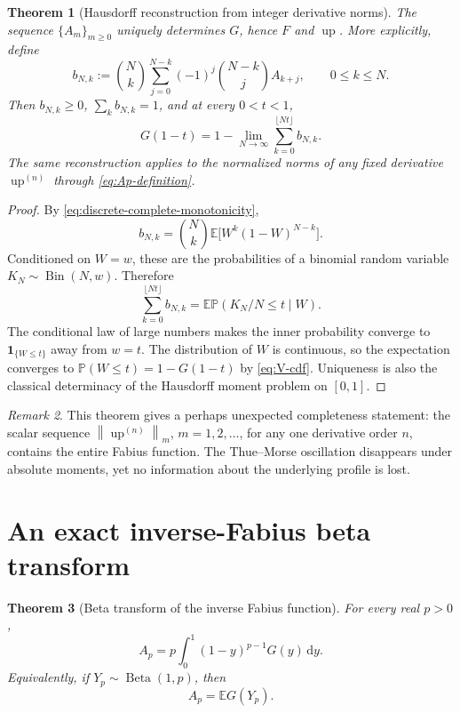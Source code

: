 \documentclass[11pt,oneside]{article}
\numberwithin{equation}{section}
\theoremstyle{plain}
\newtheorem{theorem}{Theorem}[section]
\theoremstyle{definition}
\theoremstyle{remark}
\newtheorem{remark}[theorem]{Remark}
\newcommand{\Up}{\operatorname{up}}
\newcommand{\dd}{\,\mathrm d}
\newcommand{\E}{\mathbb E}
\newcommand{\Prob}{\mathbb P}
\newcommand{\norm}[1]{\left\lVert#1\right\rVert}
\begin{document}
\begin{theorem}[Hausdorff reconstruction from integer derivative norms]
\label{thm:hausdorff-reconstruction}
The sequence $\{A_m\}_{m\geq0}$ uniquely determines $G$, hence $F$ and $\Up$.
More explicitly, define
\begin{equation}
 b_{N,k}:=\binom Nk
 \sum_{j=0}^{N-k}(-1)^j\binom{N-k}{j}A_{k+j},
 \qquad0\leq k\leq N.
 \label{eq:bernstein-masses}
\end{equation}
Then $b_{N,k}\geq0$, $\sum_kb_{N,k}=1$, and at every $0<t<1$,
\begin{equation}
 \boxed{
 G(1-t)=1-\lim_{N\to\infty}
 \sum_{k=0}^{\lfloor Nt\rfloor}b_{N,k}.}
 \label{eq:G-from-norms}
\end{equation}
The same reconstruction applies to the normalized norms of any fixed derivative
$\Up^{(n)}$ through \eqref{eq:Ap-definition}.
\end{theorem}

\begin{proof}
By \eqref{eq:discrete-complete-monotonicity},
\[
 b_{N,k}=\binom Nk\E\bigl[W^k(1-W)^{N-k}\bigr].
\]
Conditioned on $W=w$, these are the probabilities of a binomial random variable
$K_N\sim\operatorname{Bin}(N,w)$.  Therefore
\[
 \sum_{k=0}^{\lfloor Nt\rfloor}b_{N,k}
 =\E\Prob(K_N/N\leq t\mid W).
\]
The conditional law of large numbers makes the inner probability converge to
$\mathbf1_{\{W\leq t\}}$ away from $w=t$.  The distribution of $W$ is continuous, so the
expectation converges to $\Prob(W\leq t)=1-G(1-t)$ by
\eqref{eq:V-cdf}.  Uniqueness is also the classical determinacy of the Hausdorff moment
problem on $[0,1]$.
\end{proof}

\begin{remark}
This theorem gives a perhaps unexpected completeness statement: the scalar sequence
$\norm{\Up^{(n)}}_m$, $m=1,2,\ldots$, for any one derivative order $n$, contains the entire
Fabius function.  The Thue--Morse oscillation disappears under absolute moments, yet no
information about the underlying profile is lost.
\end{remark}

\section{An exact inverse-Fabius beta transform}
\label{sec:beta-transform}

\begin{theorem}[Beta transform of the inverse Fabius function]
\label{thm:beta-transform}
For every real $p>0$,
\begin{equation}
 \boxed{
 A_p=p\int_0^1(1-y)^{p-1}G(y)\dd y.}
 \label{eq:beta-transform}
\end{equation}
Equivalently, if $Y_p\sim\operatorname{Beta}(1,p)$, then
\begin{equation}
 \boxed{A_p=\E G(Y_p).}
 \label{eq:beta-expectation}
\end{equation}
\end{theorem}
\end{document}
